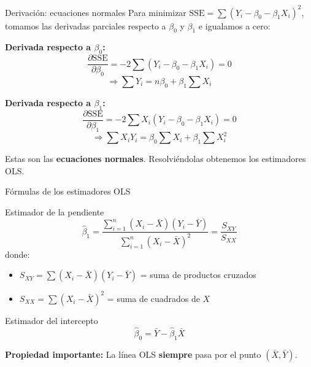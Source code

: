 \documentclass[aspectratio=169, 11pt]{beamer}
\begin{document}
\begin{frame}{Derivación: ecuaciones normales}
Para minimizar $\text{SSE} = \sum (Y_i - \beta_0 - \beta_1 X_i)^2$, tomamos las derivadas parciales respecto a $\beta_0$ y $\beta_1$ e igualamos a cero:

\vspace{0.2cm}
\textbf{Derivada respecto a $\beta_0$:}
\[
\frac{\partial \text{SSE}}{\partial \beta_0} = -2 \sum (Y_i - \beta_0 - \beta_1 X_i) = 0
\]
\[
\Rightarrow \sum Y_i = n \beta_0 + \beta_1 \sum X_i
\]

\vspace{0.2cm}
\textbf{Derivada respecto a $\beta_1$:}
\[
\frac{\partial \text{SSE}}{\partial \beta_1} = -2 \sum X_i(Y_i - \beta_0 - \beta_1 X_i) = 0
\]
\[
\Rightarrow \sum X_i Y_i = \beta_0 \sum X_i + \beta_1 \sum X_i^2
\]

\vspace{0.2cm}
Estas son las \textbf{ecuaciones normales}. Resolviéndolas obtenemos los estimadores OLS.
\end{frame}

\begin{frame}{Fórmulas de los estimadores OLS}
\begin{block}{Estimador de la pendiente}
\[
\hat{\beta}_1 = \frac{\sum_{i=1}^{n}(X_i - \bar{X})(Y_i - \bar{Y})}{\sum_{i=1}^{n}(X_i - \bar{X})^2} = \frac{S_{XY}}{S_{XX}}
\]
donde:
\begin{itemize}
  \item $S_{XY} = \sum(X_i - \bar{X})(Y_i - \bar{Y})$ = suma de productos cruzados
  \item $S_{XX} = \sum(X_i - \bar{X})^2$ = suma de cuadrados de $X$
\end{itemize}
\end{block}

\begin{block}{Estimador del intercepto}
\[
\hat{\beta}_0 = \bar{Y} - \hat{\beta}_1 \bar{X}
\]
\end{block}

\vspace{0.2cm}
\textbf{Propiedad importante:} La línea OLS \textbf{siempre} pasa por el punto $(\bar{X}, \bar{Y})$.
\end{frame}
\end{document}
